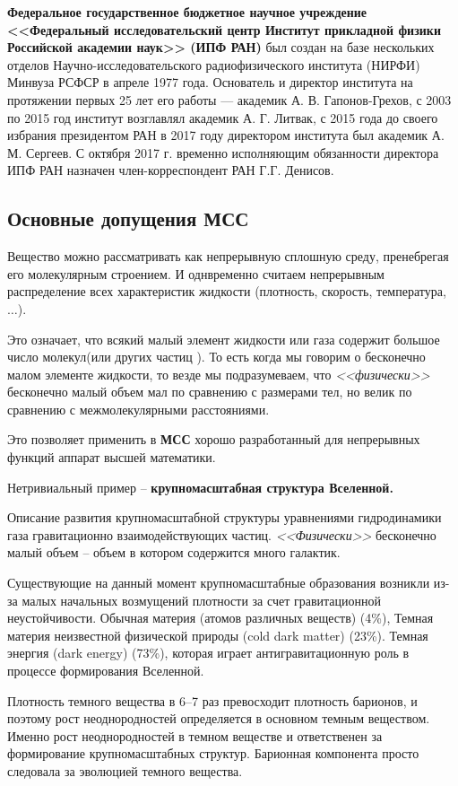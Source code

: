 \textbf{Федеральное государственное бюджетное научное учреждение <<Федеральный исследовательский центр Институт прикладной физики Российской академии наук>> (ИПФ РАН)} был создан на базе нескольких отделов Научно-исследовательского радиофизического института (НИРФИ) Минвуза РСФСР в апреле 1977 года. Основатель и директор института на протяжении первых 25 лет его работы — академик А. В. Гапонов-Грехов, с 2003 по 2015 год институт возглавлял академик А. Г. Литвак, с 2015 года до своего избрания президентом РАН в 2017 году директором института был академик А. М. Сергеев. С октября 2017 г. временно исполняющим обязанности директора ИПФ РАН назначен член-корреспондент РАН Г.Г. Денисов.

\subsection{Основные допущения \textbf{МСС}}
Вещество можно рассматривать как непрерывную сплошную среду, пренебрегая его молекулярным строением. И однвременно считаем непрерывным распределение всех характеристик жидкости (плотность, скорость, температура, $\ldots$).

Это означает, что всякий малый элемент жидкости или газа содержит большое число молекул(или других частиц ). То есть когда мы говорим о бесконечно малом элементе жидкости, то везде мы подразумеваем,  что \emph{<<физически>>} бесконечно малый объем мал по сравнению с размерами тел, но велик по сравнению с межмолекулярными расстояниями.

Это позволяет применить в \textbf{МСС} хорошо разработанный для непрерывных функций аппарат высшей математики.

Нетривиальный пример -- \textbf{крупномасштабная структура Вселенной.}

Описание развития крупномасштабной структуры  уравнениями гидродинамики газа гравитационно взаимодействующих частиц. \emph{<<Физически>>} бесконечно малый объем -- объем в котором содержится много галактик.

Существующие на данный момент крупномасштабные образования возникли из-за малых начальных возмущений плотности за счет гравитационной неустойчивости. Обычная материя (атомов различных веществ) (4\%), Темная материя неизвестной физической природы (cold dark matter) (23\%). Темная энергия (dark energy) (73\%), которая играет антигравитационную роль в процессе формирования Вселенной.

Плотность темного вещества в 6--7 раз превосходит плотность барионов, и поэтому рост неоднородностей определяется в основном темным веществом. Именно рост неоднородностей в темном веществе и ответственен за формирование крупномасштабных структур. Барионная компонента просто следовала за эволюцией темного вещества.

